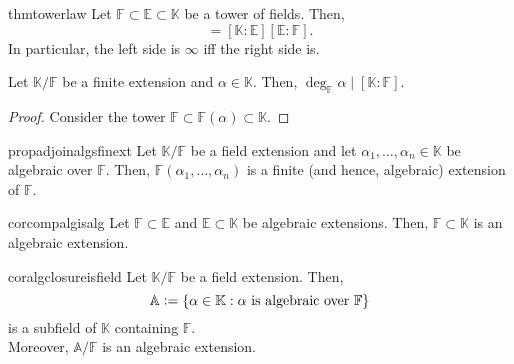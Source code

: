 \begin{restatable}{thm}{towerlaw}
\label{thm:towerlaw}
    Let $\mathbb{F} \subset \mathbb{E} \subset \mathbb{K}$ be a tower of fields. Then,
    \begin{equation*} 
        [\mathbb{K} : \mathbb{F}] = [\mathbb{K} : \mathbb{E}][\mathbb{E} : \mathbb{F}].
    \end{equation*}
    In particular, the left side is $\infty$ iff the right side is. \hfill\hyperref[thm:towerlaw2]{\downsym}
\end{restatable}

\begin{cor}
    Let $\mathbb{K}/\mathbb{F}$ be a finite extension and $\alpha \in \mathbb{K}.$ Then, $\deg_{\mathbb{F}} \alpha \mid [\mathbb{K} : \mathbb{F}].$
\end{cor}
\begin{proof}
    Consider the tower $\mathbb{F} \subset \mathbb{F}(\alpha) \subset \mathbb{K}.$
\end{proof}

\begin{restatable}[]{prop}{adjoinalgsfinext}
\label{prop:adjoinalgsfinext}
    Let $\mathbb{K}/\mathbb{F}$ be a field extension and let $\alpha_1, \ldots, \alpha_n \in \mathbb{K}$ be algebraic over $\mathbb{F}.$ Then, $\mathbb{F}(\alpha_1, \ldots, \alpha_n)$ is a finite (and hence, algebraic) extension of $\mathbb{F}.$ \hfill\hyperref[prop:adjoinalgsfinext2]{\downsym}
\end{restatable}

\begin{restatable}[]{cor}{compalgisalg}
\label{cor:compalgisalg}
   Let $\mathbb{F} \subset \mathbb{E}$ and $\mathbb{E} \subset \mathbb{K}$ be algebraic extensions. Then, $\mathbb{F} \subset \mathbb{K}$ is an algebraic extension.  \hfill\hyperref[cor:compalgisalg2]{\downsym}
\end{restatable}

\begin{restatable}[]{cor}{algclosureisfield}
\label{cor:algclosureisfield}
    Let $\mathbb{K}/\mathbb{F}$ be a field extension. Then,
    \begin{equation*} 
        \mathbb{A} \vcentcolon= \{\alpha \in \mathbb{K} : \alpha \text{ is algebraic over }\mathbb{F}\}
    \end{equation*} is a subfield of $\mathbb{K}$ containing $\mathbb{F}.$ \\
    Moreover, $\mathbb{A}/\mathbb{F}$ is an algebraic extension. \hfill\hyperref[cor:algclosureisfield2]{\downsym}
\end{restatable}

